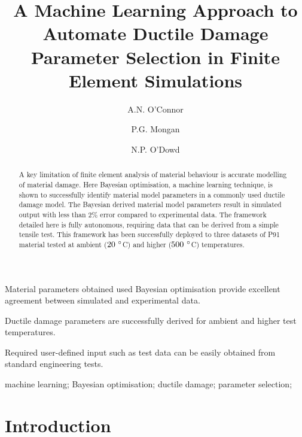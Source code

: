 \documentclass[preprint, review, 12pt]{elsarticle}
\begin{document}
	\begin{frontmatter}


		\title{A Machine Learning Approach to Automate Ductile Damage Parameter Selection in Finite Element Simulations}

		\author[1,2]{A.N. O'Connor}
		\author[1,3]{P.G. Mongan}
		\author[1,2,3]{N.P. O'Dowd}

		\address[1]{School of Engineering, University of Limerick, Ireland}
		\address[2]{Bernal Institute, University of Limerick, Ireland}
		\address[3]{Confirm Smart Manufacturing Research Centre, Ireland}

		\begin{abstract}
			A key limitation of finite element analysis of material behaviour is accurate modelling of material damage.
			Here Bayesian optimisation, a machine learning technique, is shown to successfully identify material model parameters in a commonly used ductile damage model.
			The Bayesian derived material model parameters result in simulated output with less than 2\% error compared to experimental data.
			The framework detailed here is fully autonomous, requiring data that can be derived from a simple tensile test.
			This framework has been successfully deployed to three datasets of P91 material tested at ambient ($20~\degree$C) and higher ($500~\degree$C) temperatures.
		\end{abstract}

		\begin{highlights}
			\item Material parameters obtained used Bayesian optimisation provide excellent agreement between simulated and experimental data.
			\item Ductile damage parameters are successfully derived for ambient and higher test temperatures.
			\item Required user-defined input such as test data can be easily obtained from standard engineering tests.
		\end{highlights}

		\begin{keyword}
			machine learning;
			Bayesian optimisation;
			ductile damage;
			parameter selection;
		\end{keyword}

	\end{frontmatter}

	\section{Introduction}
	\label{h:introduction}
\end{document}
